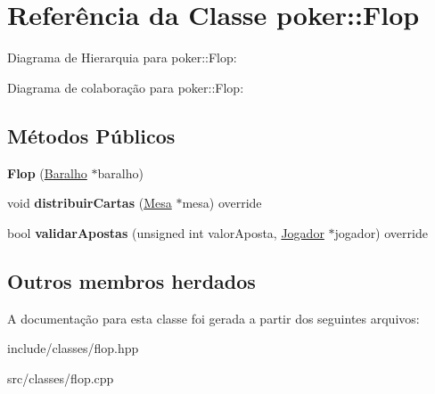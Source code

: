 \hypertarget{classpoker_1_1Flop}{}\section{Referência da Classe poker\+:\+:Flop}
\label{classpoker_1_1Flop}


Diagrama de Hierarquia para poker\+:\+:Flop\+:


Diagrama de colaboração para poker\+:\+:Flop\+:
\subsection*{Métodos Públicos}
\begin{DoxyCompactItemize}
\item 
\mbox{\label{classpoker_1_1Flop_ae4d7c8e0e7ac6224fccd5078e1439c71}} 
{\bfseries Flop} (\hyperlink{classpoker_1_1Baralho}{Baralho} $\ast$baralho)
\item 
\mbox{\label{classpoker_1_1Flop_afd819f72ca5fb40d8d2c5abf23460247}} 
void {\bfseries distribuir\+Cartas} (\hyperlink{classpoker_1_1Mesa}{Mesa} $\ast$mesa) override
\item 
\mbox{\label{classpoker_1_1Flop_a483456d438d9243c2a0f0640f4f05a03}} 
bool {\bfseries validar\+Apostas} (unsigned int valor\+Aposta, \hyperlink{classpoker_1_1Jogador}{Jogador} $\ast$jogador) override
\end{DoxyCompactItemize}
\subsection*{Outros membros herdados}


A documentação para esta classe foi gerada a partir dos seguintes arquivos\+:\begin{DoxyCompactItemize}
\item 
include/classes/flop.\+hpp\item 
src/classes/flop.\+cpp\end{DoxyCompactItemize}
